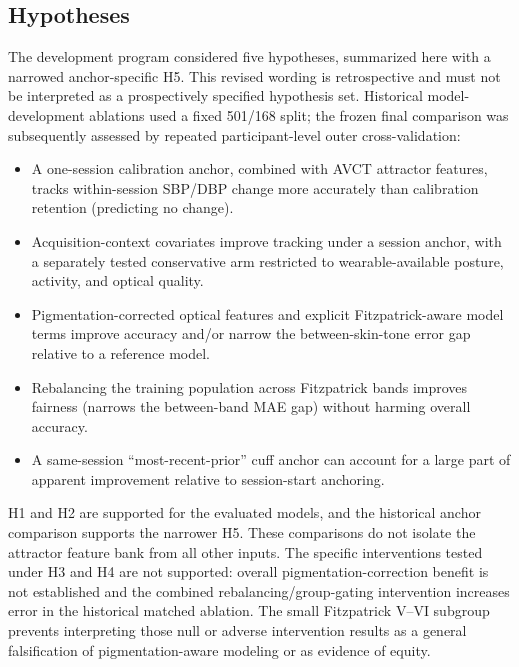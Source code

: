 \documentclass[journal]{IEEEtran}
\begin{document}
\subsection{Hypotheses}
The development program considered five hypotheses, summarized here with a narrowed anchor-specific H5. This revised wording is retrospective and must not be interpreted as a prospectively specified hypothesis set. Historical model-development ablations used a fixed 501/168 split; the frozen final comparison was subsequently assessed by repeated participant-level outer cross-validation:
\begin{itemize}
\item[\textbf{H1}] A one-session calibration anchor, combined with AVCT attractor features, tracks within-session SBP/DBP change more accurately than calibration retention (predicting no change).
\item[\textbf{H2}] Acquisition-context covariates improve tracking under a session anchor, with a separately tested conservative arm restricted to wearable-available posture, activity, and optical quality.
\item[\textbf{H3}] Pigmentation-corrected optical features and explicit Fitzpatrick-aware model terms improve accuracy and/or narrow the between-skin-tone error gap relative to a reference model.
\item[\textbf{H4}] Rebalancing the training population across Fitzpatrick bands improves fairness (narrows the between-band MAE gap) without harming overall accuracy.
\item[\textbf{H5}] A same-session ``most-recent-prior'' cuff anchor can account for a large part of apparent improvement relative to session-start anchoring.
\end{itemize}
H1 and H2 are supported for the evaluated models, and the historical anchor comparison supports the narrower H5. These comparisons do not isolate the attractor feature bank from all other inputs. The specific interventions tested under H3 and H4 are not supported: overall pigmentation-correction benefit is not established and the combined rebalancing/group-gating intervention increases error in the historical matched ablation. The small Fitzpatrick V--VI subgroup prevents interpreting those null or adverse intervention results as a general falsification of pigmentation-aware modeling or as evidence of equity.
\end{document}

